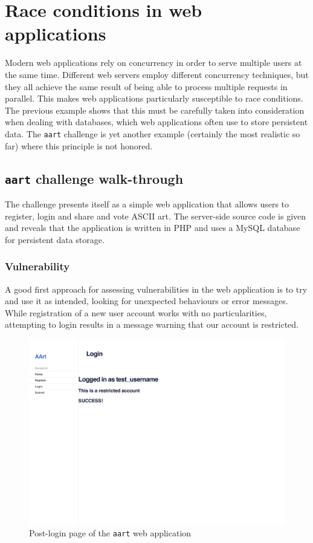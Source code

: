 \section{Race conditions in web applications}

Modern web applications rely on concurrency in order to serve multiple users at the same time. Different web servers employ different concurrency techniques, but they all achieve the same result of being able to process multiple requests in parallel. This makes web applications particularly susceptible to race conditions. \\

The previous example shows that this must be carefully taken into consideration when dealing with databases, which web applications often use to store persistent data. The \texttt{aart} challenge is yet another example (certainly the most realistic so far) where this principle is not honored.

\subsection{\texttt{aart} challenge walk-through}

The challenge presents itself as a simple web application that allows users to register, login and share and vote ASCII art. The server-side source code is given and reveals that the application is written in PHP and uses a MySQL database for persistent data storage. \\

\subsubsection{Vulnerability}
 
A good first approach for assessing vulnerabilities in the web application is to try and use it as intended, looking for unexpected behaviours or error messages. While registration of a new user account works with no particularities, attempting to login results in a message warning that our account is restricted.

\begin{figure}[h]
\includegraphics[width=\textwidth]{img/aart_login.pdf}
\caption{Post-login page of the \texttt{aart} web application}
\label{fig:aartlogin}
\end{figure}

